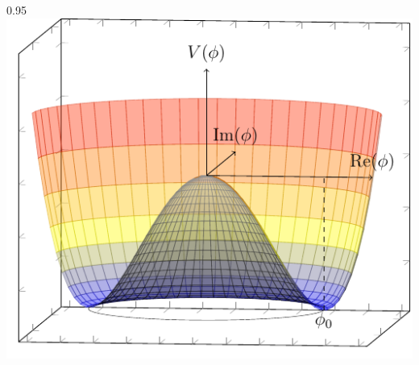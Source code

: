 \begin{minipagewithmarginpars}[h]{0.95\textwidth}
\centering
\includegraphics[scale=1]{SM/good.pdf}
\label{pot}
\end{minipagewithmarginpars}

